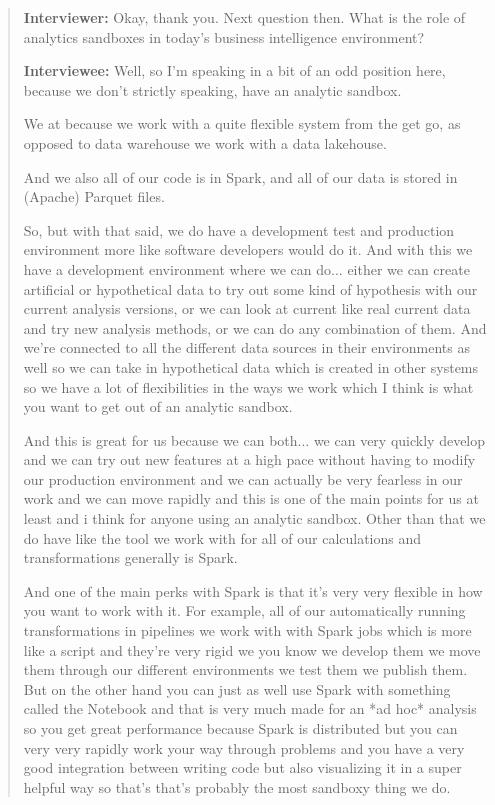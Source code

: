\begin{quote}
    \textbf{Interviewer:} Okay, thank you. Next question then. What is the role of analytics sandboxes in today's business intelligence environment?

    \textbf{Interviewee:} Well, so I'm speaking in a bit of an odd position here, because we don't strictly speaking, have an analytic sandbox.

    We at because we work with a quite flexible system from the get go, as opposed to data warehouse we work with a data lakehouse.
    
    And we also all of our code is in Spark, and all of our data is stored in (Apache) Parquet files.
    
    So, but with that said, we do have a development test and production environment more like software developers would do it. 
    And with this we have a development environment where we can do... either we can create artificial or hypothetical data to try out some kind of hypothesis with our current analysis versions, or we can look at current like real current data and try new analysis methods, or we can do any combination of them.
    And we're connected to all the different data sources in their environments as well so we can take in hypothetical data which is created in other systems so we have a lot of flexibilities in the ways we work which I think is what you want to get out of an analytic sandbox.
    
    And this is great for us because we can both... we can very quickly develop and we can try out new features at a high pace without having to modify our production environment and we can actually be very fearless in our work and we can move rapidly and this is one of the main points for us at least and i think for anyone using an analytic sandbox.
    Other than that we do have like the tool we work with for all of our calculations and transformations generally is Spark.
    
    And one of the main perks with Spark is that it's very very flexible in how you want to work with it. 
    For example, all of our automatically running transformations in pipelines we work with with Spark jobs which is more like a script and they're very rigid we you know we develop them we move them through our different environments we test them we publish them.
    But on the other hand you can just as well use Spark with something called the Notebook and that is very much made for an *ad hoc* analysis so you get great performance because Spark is distributed but you can very very rapidly work your way through problems and you have a very good integration between writing code but also visualizing it in a super helpful way so that's that's probably the most sandboxy thing we do.


\end{quote}
